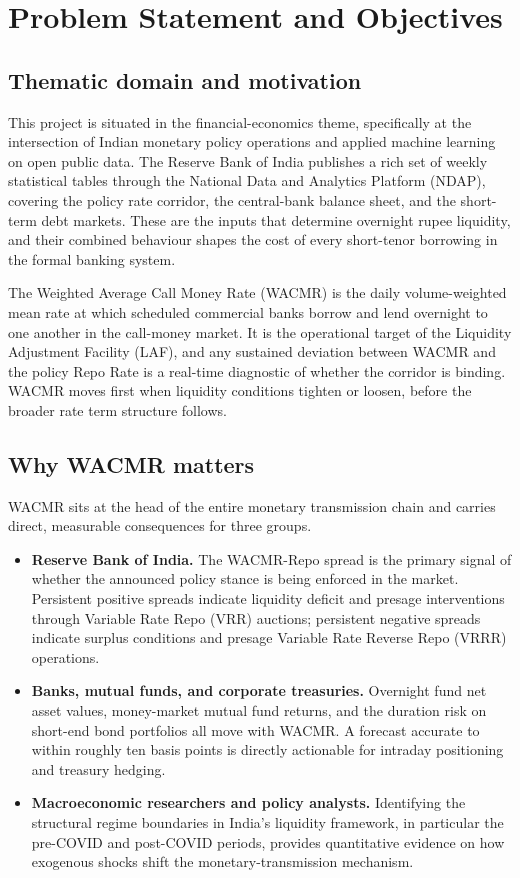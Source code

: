 \section{Problem Statement and Objectives}
\label{sec:problem}

\subsection{Thematic domain and motivation}

This project is situated in the financial-economics theme, specifically
at the intersection of Indian monetary policy operations and applied
machine learning on open public data. The Reserve Bank of India
publishes a rich set of weekly statistical tables through the National
Data and Analytics Platform (NDAP), covering the policy rate corridor,
the central-bank balance sheet, and the short-term debt markets. These
are the inputs that determine overnight rupee liquidity, and their
combined behaviour shapes the cost of every short-tenor borrowing in
the formal banking system.

The Weighted Average Call Money Rate (WACMR) is the daily volume-weighted
mean rate at which scheduled commercial banks borrow and lend overnight
to one another in the call-money market. It is the operational target
of the Liquidity Adjustment Facility (LAF), and any sustained deviation
between WACMR and the policy Repo Rate is a real-time diagnostic of
whether the corridor is binding. WACMR moves first when liquidity
conditions tighten or loosen, before the broader rate term structure
follows.

\subsection{Why WACMR matters}

WACMR sits at the head of the entire monetary transmission chain and
carries direct, measurable consequences for three groups.

\begin{itemize}
\item \textbf{Reserve Bank of India.} The WACMR-Repo spread is the
  primary signal of whether the announced policy stance is being
  enforced in the market. Persistent positive spreads indicate
  liquidity deficit and presage interventions through Variable Rate
  Repo (VRR) auctions; persistent negative spreads indicate surplus
  conditions and presage Variable Rate Reverse Repo (VRRR) operations.
\item \textbf{Banks, mutual funds, and corporate treasuries.} Overnight
  fund net asset values, money-market mutual fund returns, and the
  duration risk on short-end bond portfolios all move with WACMR. A
  forecast accurate to within roughly ten basis points is directly
  actionable for intraday positioning and treasury hedging.
\item \textbf{Macroeconomic researchers and policy analysts.}
  Identifying the structural regime boundaries in India's liquidity
  framework, in particular the pre-COVID and post-COVID periods,
  provides quantitative evidence on how exogenous shocks shift the
  monetary-transmission mechanism.
\end{itemize}

